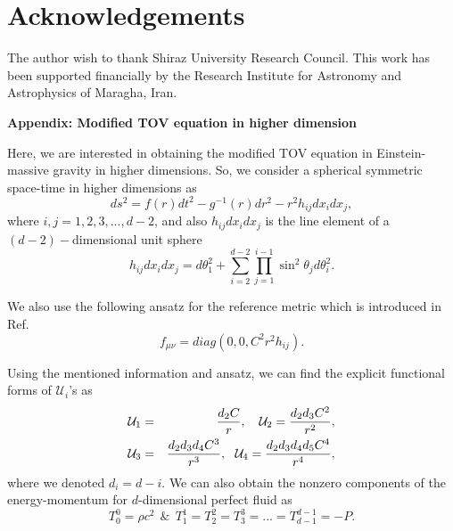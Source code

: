 \documentclass[aps]{revtex4}
\begin{document}

\section{Acknowledgements}

The author wish to thank Shiraz University Research Council. This work has
been supported financially by the Research Institute for Astronomy and
Astrophysics of Maragha, Iran.

\begin{center}
\textbf{Appendix: Modified TOV equation in higher dimension }
\end{center}

Here, we are interested in obtaining the modified TOV equation in
Einstein-massive gravity in higher dimensions. So, we consider a spherical
symmetric space-time in higher dimensions as
\begin{equation}
ds^{2}=f(r)dt^{2}-g^{-1}(r)dr^{2}-r^{2}h_{ij}dx_{i}dx_{j},
\label{Metrichigher}
\end{equation}%
where $i,j=1,2,3,...,d-2$, and also $h_{ij}dx_{i}dx_{j}$ is the line element
of a $(d-2)-$dimensional unit sphere
\begin{equation}
h_{ij}dx_{i}dx_{j}=d\theta
_{1}^{2}+\sum\limits_{i=2}^{d-2}\prod\limits_{j=1}^{i-1}\sin ^{2}\theta
_{j}d\theta _{i}^{2}.
\end{equation}

We also use the following ansatz for the reference metric which is
introduced in Ref. \cite{CaiHPZ}
\begin{equation}
f_{\mu \nu }=diag(0,0,C^{2}r^{2}h_{ij}).  \label{fd1}
\end{equation}

Using the mentioned information and ansatz, we can find the explicit
functional forms of $\mathcal{U}_{i}$'s as
\begin{eqnarray}
\mathcal{U}_{1} &=&\frac{d_{2}C}{r},\text{ \ \ }\mathcal{U}_{2}=\frac{%
d_{2}d_{3}C^{2}}{r^{2}},  \nonumber \\
\mathcal{U}_{3} &=&\frac{d_{2}d_{3}d_{4}C^{3}}{r^{3}},\text{ \ }\mathcal{U}%
_{4}=\frac{d_{2}d_{3}d_{4}d_{5}C^{4}}{r^{4}},
\end{eqnarray}%
where we denoted $d_{i}=d-i$. We can also obtain the nonzero components of
the energy-momentum for $d$-dimensional perfect fluid as
\begin{equation}
T_{0}^{0}=\rho c^{2}~\ \&\ \
T_{1}^{1}=T_{2}^{2}=T_{3}^{3}=...=T_{d-1}^{d-1}=-P.  \label{higherdim}
\end{equation}
\end{document}
